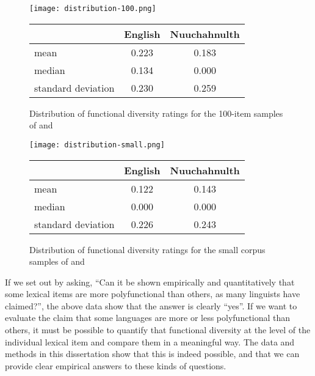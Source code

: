 \begin{figure}

  \centering
  \caption{Distribution of functional diversity ratings for the 100-item samples of  and }
  \label{fig:histogram-100-items}

  \texttt{[image: distribution-100.png]}

  \begin{tabular}{ l c c }
    \toprule
    { }                & English & Nuuchahnulth\\
    \midrule
    mean               & 0.223   & 0.183       \\
    median             & 0.134   & 0.000       \\
    standard deviation & 0.230   & 0.259       \\
    \bottomrule
  \end{tabular}

\end{figure}

\begin{figure}

  \centering
  \caption{Distribution of functional diversity ratings for the small corpus samples of  and }
  \label{fig:histogram-small-corpus}

  \texttt{[image: distribution-small.png]}

  \begin{tabular}{ l c c }
    \toprule
    { }                & English & Nuuchahnulth\\
    \midrule
    mean               & 0.122   & 0.143       \\
    median             & 0.000   & 0.000       \\
    standard deviation & 0.226   & 0.243       \\
    \bottomrule
  \end{tabular}

\end{figure}

If we set out by asking, \enquote{Can it be shown empirically and quantitatively that some lexical items are more polyfunctional than others, as many linguists have claimed?}, the above data show that the answer is clearly \enquote{yes}. If we want to evaluate the claim that some languages are more or less polyfunctional than others, it must be possible to quantify that functional diversity at the level of the individual lexical item and compare them in a meaningful way. The data and methods in this dissertation show that this is indeed possible, and that we can provide clear empirical answers to these kinds of questions.

